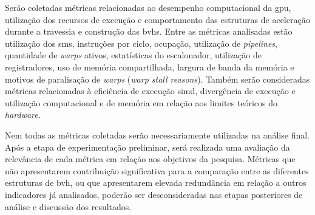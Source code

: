 

Serão coletadas métricas relacionadas ao desempenho computacional da \gls{gpu}, utilização dos recursos de execução e comportamento das estruturas de aceleração durante a travessia e construção das \glspl{bvh}. Entre as métricas analisadas estão utilização dos \glspl{sm}, instruções por ciclo, ocupação, utilização de \textit{pipelines}, quantidade de \textit{warps} ativos, estatísticas do escalonador, utilização de registradores, uso de memória compartilhada, largura de banda da memória e motivos de paralisação de \textit{warps} (\textit{warp stall reasons}). Também serão consideradas métricas relacionadas à eficiência de execução \gls{simd}, divergência de execução e utilização computacional e de memória em relação aos limites teóricos do \textit{hardware}.

Nem todas as métricas coletadas serão necessariamente utilizadas na análise final. Após a etapa de experimentação preliminar, será realizada uma avaliação da relevância de cada métrica em relação aos objetivos da pesquisa. Métricas que não apresentarem contribuição significativa para a comparação entre as diferentes estruturas de \gls{bvh}, ou que apresentarem elevada redundância em relação a outros indicadores já analisados, poderão ser desconsideradas nas etapas posteriores de análise e discussão dos resultados.

